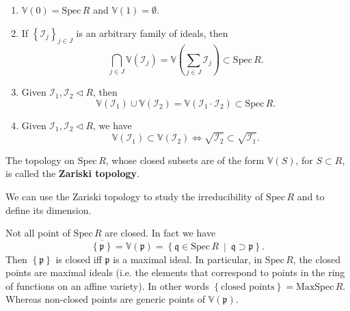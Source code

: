 \begin{lem}\leavevmode\vspace{-.2\baselineskip}
\begin{enumerate}
	\item $\mathbb{V}\left( 0 \right) = \mathrm{Spec}\, R$ and $\mathbb{V}\left( 1 \right) = \emptyset$.
	\item If $\left\{ \mathcal{I}_j \right\}_{j \in J}$ is an arbitrary family
		of ideals, then
		\begin{equation}
		\bigcap_{j \in J} \mathbb{V}\left( \mathcal{I}_j \right) =
		\mathbb{V}\left( \sum_{j \in J}^{} \mathcal{I}_j \right) \subset \mathrm{Spec}\, R
		.\end{equation} 
	\item Given $\mathcal{I}_1, \mathcal{I}_2 \triangleleft R$, then
		\begin{equation}
		\mathbb{V}\left( \mathcal{I}_1 \right) \cup \mathbb{V}\left( \mathcal{I}_2 \right) =
		\mathbb{V}\left( \mathcal{I}_1 \cdot \mathcal{I}_2 \right) \subset \mathrm{Spec}\, R
		.\end{equation} 
	\item Given $\mathcal{I}_1, \mathcal{I}_2 \triangleleft R$, we have
		\begin{equation}
		\mathbb{V}\left( \mathcal{I}_1 \right) \subset \mathbb{V}\left( \mathcal{I}_2 \right) \iff
		\sqrt{\mathcal{I}_2} \subset \sqrt{\mathcal{I}_1}
		.\end{equation} 
\end{enumerate}
\end{lem}

\begin{defn}
	The topology on $\mathrm{Spec}\, R$, whose closed subsets are of the form
	$\mathbb{V}\left( S \right)$, for $S \subset R$, is called the \textbf{Zariski topology}.
\end{defn}
\begin{rem}[]
	We can use the Zariski topology to study the irreducibility of $\mathrm{Spec}\, R$
	and to define its dimension.
\end{rem}

\begin{rem}[]
	Not all point of $\mathrm{Spec}\, R$ are closed.
	In fact we have
	\begin{equation}
	\overline{\left\{ \mathfrak{p} \right\}} = \mathbb{V}\left( \mathfrak{p} \right) =
	\left\{ \mathfrak{q} \in \mathrm{Spec}\, R \ \middle|\ \mathfrak{q} \supset \mathfrak{p} \right\}
	.\end{equation} 
	Then $\left\{ \mathfrak{p} \right\}$ is closed iff $\mathfrak{p}$ is a maximal ideal.
	In particular, in $\mathrm{Spec}\, R$, the closed points are maximal ideals (i.e. the elements
	that correspond to points in the ring of functions on an affine variety).
	In other words $\left\{ \text{closed points} \right\} = \mathrm{MaxSpec}\, R$.
	Whereas non-closed points are generic points of $\mathbb{V}\left( \mathfrak{p} \right)$.
\end{rem}

